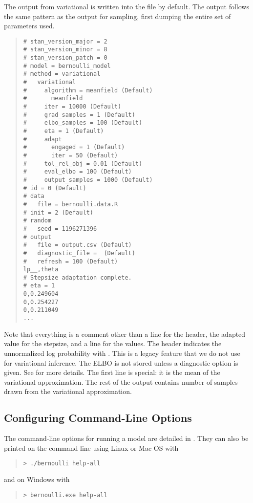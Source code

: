The output from variational is written into the file
 by default.  The output follows the same pattern as the
output for sampling, first dumping the entire set of parameters used.
%
\begin{quote}
\begin{Verbatim}[fontsize=\small]
# stan_version_major = 2
# stan_version_minor = 8
# stan_version_patch = 0
# model = bernoulli_model
# method = variational
#   variational
#     algorithm = meanfield (Default)
#       meanfield
#     iter = 10000 (Default)
#     grad_samples = 1 (Default)
#     elbo_samples = 100 (Default)
#     eta = 1 (Default)
#     adapt
#       engaged = 1 (Default)
#       iter = 50 (Default)
#     tol_rel_obj = 0.01 (Default)
#     eval_elbo = 100 (Default)
#     output_samples = 1000 (Default)
# id = 0 (Default)
# data
#   file = bernoulli.data.R
# init = 2 (Default)
# random
#   seed = 1196271396
# output
#   file = output.csv (Default)
#   diagnostic_file =  (Default)
#   refresh = 100 (Default)
lp__,theta
# Stepsize adaptation complete.
# eta = 1
0,0.249604
0,0.254227
0,0.211049
...
\end{Verbatim}
\end{quote}
%
Note that everything is a comment other than a line for the header, the adapted
value for the stepsize, and a line for the values. The header indicates the
unnormalized log probability with . This is a legacy feature that
we do not use for variational inference. The ELBO is not stored unless a
diagnostic option is given. See  for more
details.
The first line is special: it is the mean of the variational approximation.
The rest of the output contains  number of samples
drawn from the variational approximation.

\subsection{Configuring Command-Line Options}

The command-line options for running a model are detailed in
. They can also be printed on the command line
using Linux or Mac OS with
%
\begin{quote}
\begin{Verbatim}[fontshape=sl]
> ./bernoulli help-all
\end{Verbatim}
\end{quote}
%
and on Windows with
%
\begin{quote}
\begin{Verbatim}[fontshape=sl]
> bernoulli.exe help-all
\end{Verbatim}
\end{quote}
%


